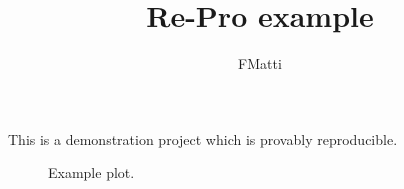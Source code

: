 \documentclass[12pt]{article}
\title{Re-Pro example}
\author{FMatti}
\begin{document}
\maketitle

This is a demonstration project which is provably reproducible. \cite{article2021}

\begin{figure}[ht]
    \centering
    
    \caption{Example plot.}
\end{figure}



\end{document}

